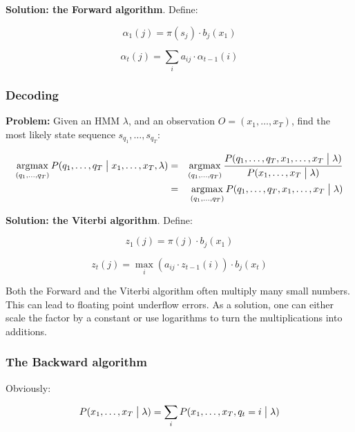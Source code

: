 \documentclass[11pt]{article}
\DeclareMathOperator*{\argmax}{\arg\!\max}
\begin{document}
\textbf{Solution: the Forward algorithm}. Define:

\begin{equation}
    \alpha_1(j) = \pi(s_j) \cdot b_j(x_1)
\end{equation}

\begin{equation}
    \alpha_t(j) = \sum\limits_i a_{ij} \cdot \alpha_{t-1}(i)
\end{equation}

\subsubsection{Decoding}

\textbf{Problem:} Given an HMM $\lambda$, and an observation $O = (x_1, \ldots, x_T)$, find the most likely state sequence $s_{q_1}, \ldots, s_{q_T}$:

\begin{eqnarray*}
    \argmax_{(q_1, \ldots, q_T)} P(q_1, \ldots, q_T \bigm| x_1, \ldots, x_T, \lambda)
    &=& \argmax_{(q_1, \ldots, q_T)} \frac{P(q_1, \ldots, q_T, x_1, \ldots, x_T \bigm| \lambda)}{P(x_1, \ldots, x_T \bigm| \lambda)} \\
    &=& \argmax_{(q_1, \ldots, q_T)} P(q_1, \ldots, q_T, x_1, \ldots, x_T \bigm| \lambda)
\end{eqnarray*}

\textbf{Solution: the Viterbi algorithm}. Define:

\begin{equation}
    z_1(j) = \pi(j) \cdot b_j(x_1)
\end{equation}

\begin{equation}
    z_t(j) = \max_i(a_{ij} \cdot z_{t-1}(i)) \cdot b_j(x_t)
\end{equation}

Both the Forward and the Viterbi algorithm often multiply many small numbers. This can lead to floating point underflow errors. As a solution, one can either scale the factor by a constant or use logarithms to turn the multiplications into additions.

\subsubsection{The Backward algorithm}

Obviously:

\begin{equation}
    P(x_1, \ldots, x_T \bigm| \lambda) = \sum\limits_i P(x_1, \ldots, x_T, q_t = i \bigm| \lambda)
\end{equation}
\end{document}
